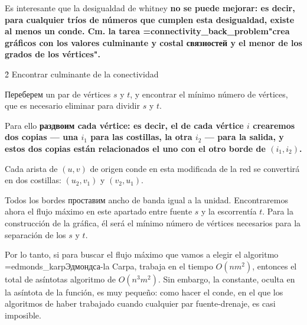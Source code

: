 Es interesante que la desigualdad de whitney \bf{no se puede mejorar}: es decir, para cualquier tríos de números que cumplen esta desigualdad, existe al menos un conde. Cm. la tarea \algohref=connectivity_back_problem{"crea gráficos con los valores culminante y costal связностей y el menor de los grados de los vértices"}.


\h2{ Encontrar culminante de la conectividad }

Переберем un par de vértices $s$ y $t$, y encontrar el mínimo número de vértices, que es necesario eliminar para dividir $s$ y $t$.

Para ello \bf{раздвоим} cada vértice: es decir, el de cada vértice $i$ crearemos dos copias --- una $i_1$ para las costillas, la otra $i_2$ --- para la salida, y estos dos copias están relacionados el uno con el otro borde de $(i_1, i_2)$.

Cada arista de $(u,v)$ de origen conde en esta modificada de la red se convertirá en dos costillas: $(u_2, v_1)$ y $(v_2, u_1)$.

Todos los bordes проставим ancho de banda igual a la unidad. Encontraremos ahora el flujo máximo en este apartado entre fuente $s$ y la escorrentía $t$. Para la construcción de la gráfica, él será el mínimo número de vértices necesarios para la separación de los $s$ y $t$.

Por lo tanto, si para buscar el flujo máximo que vamos a elegir el algoritmo \algohref=edmonds_karp{Эдмондса-la Carpa}, trabaja en el tiempo $O (n m^2)$, entonces el total de asíntotas algoritmo de $O (n^3 m^2)$. Sin embargo, la constante, oculta en la asíntota de la función, es muy pequeño: como hacer el conde, en el que los algoritmos de haber trabajado cuando cualquier par fuente-drenaje, es casi imposible.

